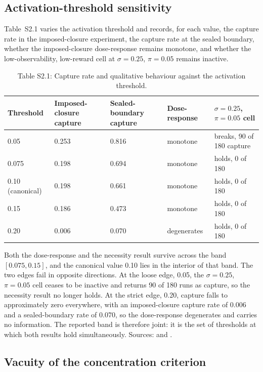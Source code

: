\documentclass[12pt]{article}
\begin{document}
\subsection{Activation-threshold sensitivity}

Table~S2.1 varies the activation threshold and records, for each value, the
capture rate in the imposed-closure experiment, the capture rate at the sealed
boundary, whether the imposed-closure dose-response remains monotone, and
whether the low-observability, low-reward cell at $\sigma=0.25$, $\pi=0.05$
remains inactive.

\begin{table}[htbp]
\centering
\footnotesize
\caption{Table S2.1: Capture rate and qualitative behaviour against the activation threshold.}
\begin{tabular}{p{2.0cm}p{2.5cm}p{2.5cm}p{2.2cm}p{3.6cm}}
\toprule
Threshold & Imposed-closure capture & Sealed-boundary capture & Dose-response & $\sigma=0.25$, $\pi=0.05$ cell \\
\midrule
0.05 & 0.253 & 0.816 & monotone & breaks, 90 of 180 capture \\
0.075 & 0.198 & 0.694 & monotone & holds, 0 of 180 \\
0.10 (canonical) & 0.198 & 0.661 & monotone & holds, 0 of 180 \\
0.15 & 0.186 & 0.473 & monotone & holds, 0 of 180 \\
0.20 & 0.006 & 0.070 & degenerates & holds, 0 of 180 \\
\bottomrule
\end{tabular}
\end{table}

Both the dose-response and the necessity result survive across the band
$[0.075, 0.15]$, and the canonical value 0.10 lies in the interior of that
band. The two edges fail in opposite directions. At the loose edge, 0.05, the
$\sigma=0.25$, $\pi=0.05$ cell ceases to be inactive and returns 90 of 180 runs
as capture, so the necessity result no longer holds. At the strict edge, 0.20,
capture falls to approximately zero everywhere, with an imposed-closure capture
rate of 0.006 and a sealed-boundary rate of 0.070, so the dose-response
degenerates and carries no information. The reported band is therefore joint:
it is the set of thresholds at which both results hold simultaneously. Sources:
 and .

\subsection{Vacuity of the concentration criterion}
\end{document}
